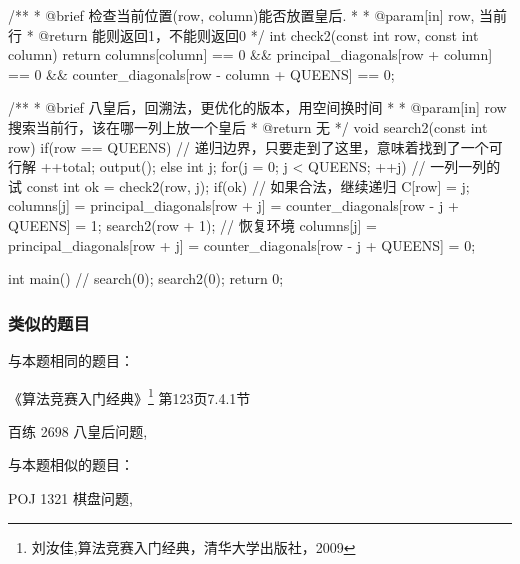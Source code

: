 \begin{Codex}[label=eight_queen.c]
/** 
 * @brief 检查当前位置(row, column)能否放置皇后.
 *
 * @param[in] row, 当前行
 * @return 能则返回1，不能则返回0
 */
int check2(const int row, const int column) {
    return columns[column] == 0 && principal_diagonals[row + column] == 0 
        && counter_diagonals[row - column + QUEENS] == 0;
}

/** 
 * @brief 八皇后，回溯法，更优化的版本，用空间换时间
 *
 * @param[in] row 搜索当前行，该在哪一列上放一个皇后
 * @return 无
 */
void search2(const int row) {
    if(row == QUEENS) {  // 递归边界，只要走到了这里，意味着找到了一个可行解
        ++total;
        output();
    } else {
        int j;
        for(j = 0; j < QUEENS; ++j) {  // 一列一列的试
            const int ok = check2(row, j);
            if(ok) {  // 如果合法，继续递归
                C[row] = j;
                columns[j] = principal_diagonals[row + j] = 
                    counter_diagonals[row - j + QUEENS] = 1;
                search2(row + 1);
                // 恢复环境
                columns[j] = principal_diagonals[row + j] = 
                    counter_diagonals[row - j + QUEENS] = 0;
            }
        }
    }
}

int main() {
    // search(0);
    search2(0);
    return 0;
}
\end{Codex}

\subsubsection{类似的题目}
与本题相同的题目：
\begindot
\item 《算法竞赛入门经典》\footnote{刘汝佳,算法竞赛入门经典，清华大学出版社，2009} 第123页7.4.1节
\item  百练 2698 八皇后问题, 
\myenddot

与本题相似的题目：
\begindot
\item POJ 1321 棋盘问题, 
\myenddot